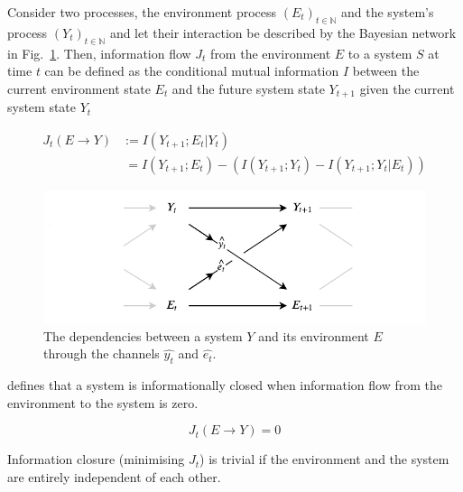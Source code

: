 \documentclass[utf8]{article}
\begin{document}
			Consider two processes, the environment process $(E_t)_{t \in \mathbb{N}}$ and the system's process $(Y_t)_{t \in \mathbb{N}}$ and let their interaction be described by the Bayesian network in Fig.~\ref{fig:SystemAndEnv}. Then, information flow $J_{t}$ from the environment $E$ to a system $S$ at time $t$ can be defined as the conditional mutual information $I$ between the current environment state $E_{t}$  and the future system state $Y_{t+1}$ given the current system state $Y_{t}$

				\begin{equation}
    				\label{eq:InformationFlow}
    				\left.\begin{array}
    				{rl}{J_{t}(E \rightarrow Y )} & {:= I(Y_{t+1};E_{t}|Y_{t})} \\
    				{ } & { \ = I(Y_{t+1};E_{t}) - (I(Y_{t+1};Y_{t})-I(Y_{t+1};Y_{t}|E_{t}))}
    				\end{array}\right.
				\end{equation}

            
				\begin{figure}
					\includegraphics[width=\textwidth]{Submission/Frontiers/SystemAndEnv_3.pdf}
					\caption{The dependencies between a system  $Y$ and its environment $E$ through the channels $\hat{y_t}$ and $\hat{e_t}$.} %
					\label{fig:SystemAndEnv}
				\end{figure}


			\noindent
			\cite{BERTSCHINGER.2006} defines that a system is informationally closed when information flow from the environment to the system is zero.

				\begin{equation}
				J_{t}(E \rightarrow Y )=0
				\label{eq:informationflow2}
				\end{equation}


			\noindent
			Information closure (minimising $J_t$) is trivial if the environment and the system are entirely independent of each other.
\end{document}
